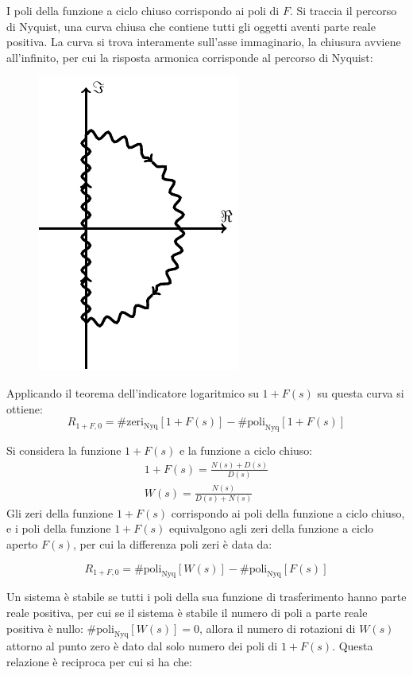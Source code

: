 \documentclass{article}
\numberwithin{equation}{subsection}
\begin{document}
I poli della funzione a ciclo chiuso corrispondo ai poli di $F$. Si traccia il percorso di Nyquist, una curva chiusa che contiene tutti gli oggetti aventi parte reale 
positiva. La curva si trova interamente sull'asse immaginario, la chiusura avviene all'infinito, per cui la risposta armonica corrisponde al percorso di Nyquist: 
\begin{figure}[H]%
    \centering
    \includegraphics{nyquist-3.pdf}%
\end{figure}

Applicando il teorema dell'indicatore logaritmico su $1+F(s)$ su questa curva si ottiene:
\begin{equation*}
    R_{1+F,0}=\#\mathrm{zeri}_\mathrm{Nyq}[1+F(s)]-\#\mathrm{poli}_\mathrm{Nyq}[1+F(s)]
\end{equation*}

Si considera la funzione $1+F(s)$ e la funzione a ciclo chiuso:
\begin{gather*}
    1+F(s)=\displaystyle\frac{N(s)+D(s)}{D(s)}\\
    W(s)=\displaystyle\frac{N(s)}{D(s)+N(s)}
\end{gather*}
Gli zeri della funzione $1+F(s)$ corrispondo ai 
poli della funzione a ciclo chiuso, e i poli della funzione $1+F(s)$ equivalgono agli zeri della funzione a ciclo aperto $F(s)$, per cui la differenza poli zeri è data da: 

\begin{equation*}
    R_{1+F,0}=\#\mathrm{poli}_\mathrm{Nyq}[W(s)]-\#\mathrm{poli}_\mathrm{Nyq}[F(s)]
\end{equation*}

Un sistema è stabile se tutti i poli della sua funzione di trasferimento hanno parte reale positiva, per cui se il sistema è stabile il numero di poli a parte reale positiva 
è nullo: $\#\mathrm{poli}_\mathrm{Nyq}[W(s)]=0$, allora il numero di rotazioni di $W(s)$ attorno al punto zero è dato dal solo numero dei poli di $1+F(s)$. Questa relazione è 
reciproca per cui si ha che:
\end{document}
